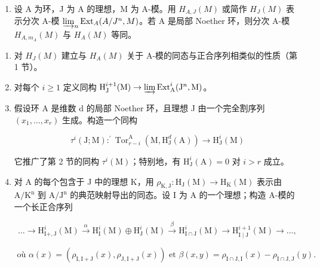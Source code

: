 
\begin{enumerate}
\def\labelenumi{\arabic{enumi})}
\tightlist
\item
  设 A 为环，J 为 A 的理想，M 为 A-模。用 \(H_{A,J}(M)\) 或简作 \(H_{J}(M)\) 表示分次 A-模 \(\varinjlim_{n}\operatorname{Ext}_{A}(A/J^{n},M)\)。若 A 是局部 Noether 环，则分次 A-模 \(H_{A,m_{A}}(M)\) 与 \(H_{A}(M)\) 等同。
\end{enumerate}

\begin{enumerate}
\def\labelenumi{\alph{enumi})}
\item
  对 \(H_{J}(M)\) 建立与 \(H_{A}(M)\) 关于 A-模的同态与正合序列相类似的性质（第 1 节）。
\item
  对每个 \(i \geqslant 1\) 定义同构 \(\mathrm{H}_{\mathrm{J}}^{i+1}(\mathrm{M}) \to \varinjlim \operatorname{Ext}_{\mathrm{A}}^{i}(\mathrm{J}^{n}, \mathrm{M})\)。
\item
  假设环 A 是维数 d 的局部 Noether 环，且理想 J 由一个完全割序列 \((x_{1},\ldots,x_{r})\) 生成。构造一个同构

\[
\tau^ {i} (\mathrm{J}; \mathrm{M}): ^ {\prime} \operatorname{Tor} _ {r - i} ^ {\mathrm{A}} (\mathrm{M}, \mathrm{H} _ {\mathrm{J}} ^ {d} (\mathrm{A})) \longrightarrow \mathrm{H} _ {\mathrm{J}} ^ {i} (\mathrm{M})
\]

它推广了第 2 节的同构 \(\tau^{i}(\mathrm{M})\)；特别地，有 \(\mathrm{H}_{\mathrm{J}}^{i}(\mathrm{A}) = 0\) 对 \(i > r\) 成立。

\item
  对 A 的每个包含于 J 中的理想 K，用 \(\rho_{\mathrm{K},\mathrm{J}}:\mathrm{H}_{\mathrm{J}}(\mathrm{M})\to \mathrm{H}_{\mathrm{K}}(\mathrm{M})\) 表示由 \(\mathrm{A / K^n}\) 到 \(\mathrm{A / J^n}\) 的典范映射导出的同态。设 I 为 A 的一个理想；构造 A-模的一个长正合序列

\[
\dots \longrightarrow \mathrm{H} _ {\mathrm{I} +, \mathrm{J}} ^ {i} (\mathrm{M}) \stackrel {\alpha} {\longrightarrow} \mathrm{H} _ {\mathrm{I}} ^ {i} (\mathrm{M}) \oplus \mathrm{H} _ {\mathrm{J}} ^ {i} (\mathrm{M}) \stackrel {\beta} {\longrightarrow} \mathrm{H} _ {\mathrm{I} \cap \mathrm{J}} ^ {i} (\mathrm{M}) \longrightarrow \mathrm{H} _ {\mathrm{I} \mid \mathrm{J}} ^ {i + 1} (\mathrm{M}) \longrightarrow \dots ,
\]

\[
\text {   où   } \alpha (x) = (\rho_ {\mathrm{I,I+J}} (x), \rho_ {\mathrm{J,I+J}} (x)) \text {   et   } \beta (x, y) = \rho_ {\mathrm{I} \cap \mathrm{J}, \mathrm{I}} (x) - \rho_ {\mathrm{I} \cap \mathrm{J}, \mathrm{J}} (y).
\]

\end{enumerate}

